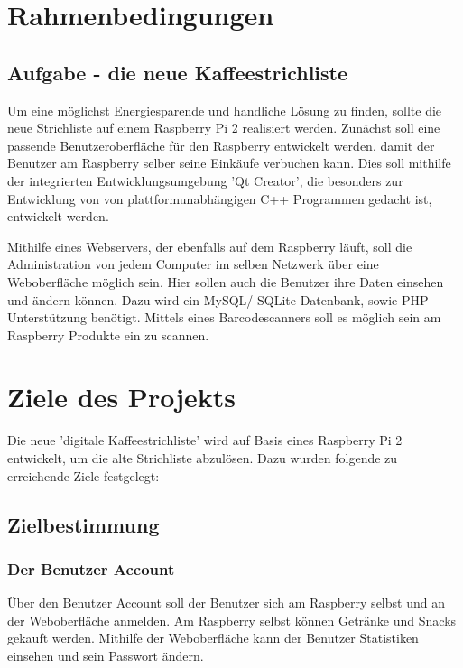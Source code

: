 \documentclass[11pt,a4paper]{article} %
\begin{document}

\section{Rahmenbedingungen}


\subsection{Aufgabe - die neue Kaffeestrichliste}
\label{SchriftAnpassen}

Um eine m\"oglichst Energiesparende und handliche L\"osung zu finden, sollte die neue Strichliste auf einem Raspberry Pi 2 realisiert werden. Zun\"achst soll eine passende Benutzeroberfl\"ache f\"ur den Raspberry entwickelt werden, damit der Benutzer am Raspberry selber seine Eink\"aufe verbuchen kann. Dies soll mithilfe der integrierten Entwicklungsumgebung 'Qt Creator', die besonders zur Entwicklung von von plattformunabh\"angigen C++ Programmen gedacht ist, entwickelt werden.
\par
Mithilfe eines Webservers, der ebenfalls auf dem Raspberry l\"auft, soll die Administration von jedem Computer im selben Netzwerk \"uber eine Weboberfl\"ache m\"oglich sein. Hier sollen auch die Benutzer ihre Daten einsehen und \"andern k\"onnen. Dazu wird ein MySQL/ SQLite Datenbank, sowie PHP Unterst\"utzung ben\"otigt. Mittels eines Barcodescanners soll es m\"oglich sein am Raspberry Produkte ein zu scannen.


\section{Ziele des Projekts}
Die neue 'digitale Kaffeestrichliste' wird auf Basis eines Raspberry Pi 2 entwickelt, um die alte Strichliste abzul\"osen. Dazu wurden folgende zu erreichende Ziele festgelegt:
\subsection{Zielbestimmung}
\label{Ausrichtung}

\subsubsection{Der Benutzer Account}
\"Uber den Benutzer Account soll der Benutzer sich am Raspberry selbst und an der Weboberfl\"ache anmelden. Am Raspberry selbst k\"onnen Getr\"anke und Snacks gekauft werden. Mithilfe der Weboberfl\"ache kann der Benutzer Statistiken einsehen und sein Passwort \"andern.
\end{document}

